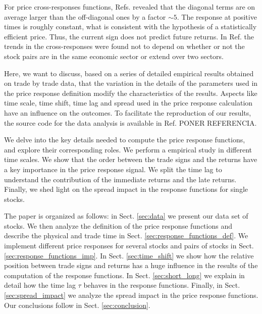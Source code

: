 For price cross-responses functions, Refs.
\cite{dissecting_cross,Wang_2016_cross} revealed that the diagonal terms are on
average larger than the off-diagonal ones by a factor $\sim 5$. The response at
positive times is roughly constant, what is consistent with the hypothesis of a
statistically efficient price. Thus, the current sign does not predict future
returns. In Ref. \cite{Wang_2016_cross} the trends in the cross-responses were
found not to depend on whether or not the stock pairs are in the same economic
sector or extend over two sectors.

Here, we want to discuss, based on a series of detailed empirical results
obtained on trade by trade data, that the variation in the details of the
parameters used in the price response definition modify the characteristics of
the results. Aspects like time scale, time shift, time lag and spread used in
the price response calculation have an influence on the outcomes. To facilitate
the reproduction of our results, the source code for the data analysis is
available in Ref. PONER REFERENCIA.

We delve into the key details needed to compute the price response functions,
and explore their corresponding roles. We perform a empirical study in
different time scales. We show that the order between the trade signs and
the returns have a key importance in the price response signal. We split the
time lag to understand the contribution of the immediate returns and the late
returns. Finally, we shed light on the spread impact in the response functions
for single stocks.

The paper is organized as follows: in Sect. \ref{sec:data} we present our data
set of stocks. We then analyze the definition of the price response functions
and describe the physical and trade time in Sect.
\ref{sec:response_functions_def}. We implement different price responses for
several stocks and pairs of stocks in Sect. \ref{sec:response_functions_imp}.
In Sect. \ref{sec:time_shift} we show how the relative position between trade
signs and returns has a huge influence in the results of the computation of the
response functions. In Sect. \ref{sec:short_long} we explain in detail how the
time lag $\tau$ behaves in the response functions. Finally, in Sect.
\ref{sec:spread_impact} we analyze the spread impact in the price response
functions. Our conclusions follow in Sect. \ref{sec:conclusion}.